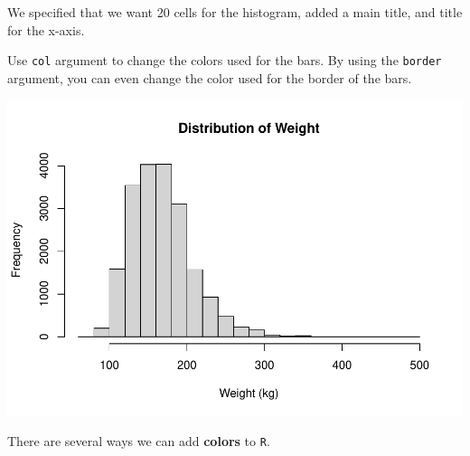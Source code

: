 \documentclass[
]{book}
\newenvironment{Shaded}{\begin{snugshade}}{\end{snugshade}}
\newcommand{\DataTypeTok}[1]{\textcolor[rgb]{0.13,0.29,0.53}{#1}}
\newcommand{\DecValTok}[1]{\textcolor[rgb]{0.00,0.00,0.81}{#1}}
\newcommand{\KeywordTok}[1]{\textcolor[rgb]{0.13,0.29,0.53}{\textbf{#1}}}
\newcommand{\NormalTok}[1]{#1}
\newcommand{\OperatorTok}[1]{\textcolor[rgb]{0.81,0.36,0.00}{\textbf{#1}}}
\newcommand{\StringTok}[1]{\textcolor[rgb]{0.31,0.60,0.02}{#1}}
\begin{document}
We specified that we want 20 cells for the histogram, added a main title, and title for the x-axis.

Use \texttt{col} argument to change the colors used for the bars. By using the \texttt{border} argument, you can even change the color used for the border of the bars.

\begin{Shaded}
\end{Shaded}

\includegraphics{_main_files/figure-latex/unnamed-chunk-129-1.pdf}

There are several ways we can add \textbf{colors} to \texttt{R}.
\end{document}
